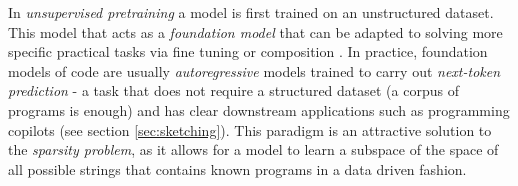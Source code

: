 In \emph{unsupervised pretraining} a model is first trained on an unstructured dataset.
This model that acts as a \emph{foundation model} \cite{yangFoundationModelsDecision2023, yuanPowerFoundationModels2023, zhouComprehensiveSurveyPretrained2023} that can be adapted to solving more specific practical tasks via fine tuning \cite{panTransferLearning2020, weissSurveyTransferLearning2016, zhuangComprehensiveSurveyTransfer2020} or composition \cite{shivakumarStudyImpactLanguage2017}.
In practice, foundation models of code are usually \emph{autoregressive} models trained to carry out \emph{next-token prediction} \cite{shlegerisLanguageModelsAre2024} - a task that does not require a structured dataset (a corpus of programs is enough) and has clear downstream applications such as programming copilots (see section \ref{sec:sketching}).
This paradigm is an attractive solution to the \emph{sparsity problem}, as it allows for a model to learn a subspace of the space of all possible strings that contains known programs in a data driven fashion.

